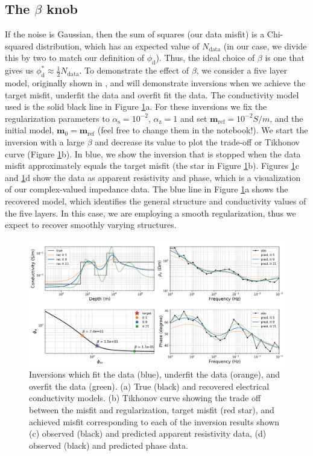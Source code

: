 \documentclass[11pt,oneside]{article}
\begin{document}
\subsection{The $\beta$ knob}
If the noise is Gaussian, then the sum of squares (our data misfit) is a Chi-squared distribution, which has an expected value of $N_\text{data}$ (in our case, we divide this by two to match our definition of $\phi_\mathrm{d}$). Thus, the ideal choice of $\beta$ is one that gives us $\phi_\mathrm{d}^* \approx \frac{1}{2} N_\text{data}$. To demonstrate the effect of $\beta$, we consider a five layer model, originally shown in \cite{Monographs}, and will demonstrate inversions when we achieve the target misfit, underfit the data and overfit fit the data. The conductivity model used is the solid black line in Figure \ref{fig:beta_knob}a. For these inversions we fix the regularization parameters to $\alpha_\mathrm{s} = 10^{-2}$, $\alpha_\mathrm{z} = 1$ and set $\mathbf{m}_{\text{ref}} = 10^{-2} S/m$, and the initial model, $\mathbf{m}_0 = \mathbf{m}_{\text{ref}}$ (feel free to change them in the notebook!). We start the inversion with a large $\beta$ and decrease its value to plot the trade-off or Tikhonov curve (Figure \ref{fig:beta_knob}b). In blue, we show the inversion that is stopped when the data misfit approximately equals the  target misfit (the star in Figure \ref{fig:beta_knob}b). Figures \ref{fig:beta_knob}c and \ref{fig:beta_knob}d show the data as apparent resistivity and phase, which is a visualization of our complex-valued impedance data. The blue line in Figure \ref{fig:beta_knob}a shows the recovered model, which identifies the general structure and conductivity values of the five layers. In this case, we are employing a smooth regularization, thus we expect to recover smoothly varying structures.


\begin{figure}[htb!]
    \centering
    \includegraphics[width=\textwidth]{images/beta_knob.png}
\caption{Inversions which fit the data (blue), underfit the data (orange), and overfit the data (green). (a) True (black) and recovered electrical conductivity models. (b) Tikhonov curve showing the trade off between the misfit and regularization, target misfit (red star), and achieved misfit corresponding to each of the inversion results shown (c) observed (black) and predicted apparent resistivity data, (d) observed (black) and predicted phase data.}
\label{fig:beta_knob}
\end{figure}
\end{document}
